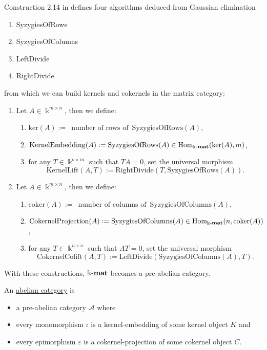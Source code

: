\begin{example}
Construction 2.14 in \cite{[Posur]} defines four algorithms deduced from Gaussian elimination
\begin{enumerate}
\renewcommand{\labelenumi}{(\theenumi)}
\item SyzygiesOfRows
\item SyzygiesOfColumns
\item LeftDivide
\item RightDivide
\end{enumerate}
from which we can build kernels and cokernels in the matrix category:
\begin{enumerate}
\renewcommand{\labelenumi}{(\theenumi)}
\item Let $A \in \Bbbk^{m\times n}$, then we define:
\begin{enumerate}
\renewcommand{\labelenumii}{(\alph{enumii})}
\item $\mathrm{ker}(A) :=\,\text{ number of rows of }\,\mathrm{SyzygiesOfRows}(A)$,
\item $\mathrm{KernelEmbedding}(A) := \mathrm{SyzygiesOfRows}(A) \in \mathrm{Hom}_{\Bbbk\textnormal{-}\mathbf{mat}}(\mathrm{ker}(A), m)$,
\item for any $T \in \Bbbk^{o\times m}$ such that $TA = 0$, set the universal morphism
\[
\mathrm{KernelLift}(A,T) := \mathrm{RightDivide}(T, \mathrm{SyzygiesOfRows}(A)).
\]
\end{enumerate}
\item Let $A \in \Bbbk^{m\times n}$, then we define:
\begin{enumerate}
\renewcommand{\labelenumii}{(\alph{enumii})}
\item $\mathrm{coker}(A) :=\,\text{ number of columns of }\,\mathrm{SyzygiesOfColumns}(A)$,
\item $\mathrm{CokernelProjection}(A) := \mathrm{SyzygiesOfColumns}(A) \in \mathrm{Hom}_{\Bbbk\textnormal{-}\mathbf{mat}}(n, \mathrm{coker}(A))$,
\item for any $T \in \Bbbk^{n\times o}$ such that $AT = 0$, set the universal morphism
\[
\mathrm{CokernelColift}(A,T) := \mathrm{LeftDivide}(\mathrm{SyzygiesOfColumns}(A), T).
\]
\end{enumerate}
\end{enumerate}
With these constructions, $\Bbbk\textnormal{-}\mathbf{mat}$ becomes a pre-abelian category.
\end{example}

\begin{definition}\label{def:abelian_category}
An \ul{abelian category} is
\begin{itemize}
\item a pre-abelian category $\mathcal{A}$ where
\item every monomorphism $\iota$ is a kernel-embedding of some kernel object $K$ and
\item every epimorphism $\varepsilon$ is a cokernel-projection of some cokernel object $C$.
\end{itemize}
\end{definition}

